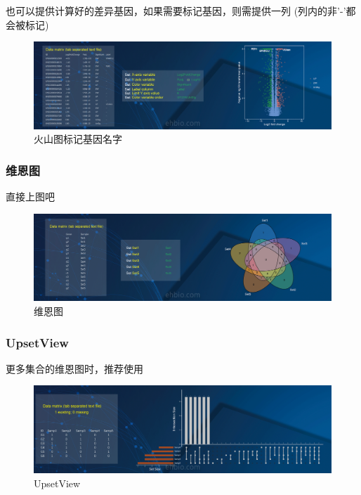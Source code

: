 \documentclass[]{article}
\numberwithin{figure}{section}
\numberwithin{table}{section}
\theoremstyle{definition}
\theoremstyle{definition}
\theoremstyle{definition}
\theoremstyle{remark}
\begin{document}
也可以提供计算好的差异基因，如果需要标记基因，则需提供一列
(列内的非'-'都会被标记)

\begin{figure}[H]

{\centering \includegraphics[width=0.95\linewidth,height=0.7\textheight,keepaspectratio]{images/Volcano_2} 

}

\caption{火山图标记基因名字}\label{fig:unnamed-chunk-260}
\end{figure}

\subsubsection{维恩图}

直接上图吧

\begin{figure}[H]

{\centering \includegraphics[width=0.95\linewidth,height=0.7\textheight,keepaspectratio]{images/VennDiagram_2} 

}

\caption{维恩图}\label{fig:unnamed-chunk-261}
\end{figure}

\subsubsection{UpsetView}\label{upsetview-1}

更多集合的维恩图时，推荐使用

\begin{figure}[H]

{\centering \includegraphics[width=0.95\linewidth,height=0.7\textheight,keepaspectratio]{images/UpsetVIew_1} 

}

\caption{UpsetView}\label{fig:unnamed-chunk-262}
\end{figure}
\end{document}

